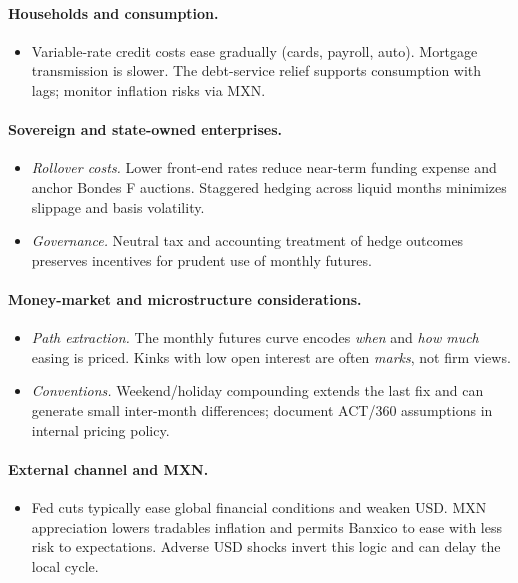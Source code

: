 \documentclass[11pt,a4paper]{article} %
\begin{document}
\paragraph{Households and consumption.}
\begin{itemize}
  \item Variable-rate credit costs ease gradually (cards, payroll, auto). Mortgage transmission is slower. The debt-service relief supports consumption with lags; monitor inflation risks via MXN.
\end{itemize}

\paragraph{Sovereign and state-owned enterprises.}
\begin{itemize}
  \item \textit{Rollover costs.} Lower front-end rates reduce near-term funding expense and anchor Bondes F auctions. Staggered hedging across liquid months minimizes slippage and basis volatility.
  \item \textit{Governance.} Neutral tax and accounting treatment of hedge outcomes preserves incentives for prudent use of monthly futures.
\end{itemize}

\paragraph{Money-market and microstructure considerations.}
\begin{itemize}
  \item \textit{Path extraction.} The monthly futures curve encodes \emph{when} and \emph{how much} easing is priced. Kinks with low open interest are often \emph{marks}, not firm views.
  \item \textit{Conventions.} Weekend/holiday compounding extends the last fix and can generate small inter-month differences; document ACT/360 assumptions in internal pricing policy.
\end{itemize}

\paragraph{External channel and MXN.}
\begin{itemize}
  \item Fed cuts typically ease global financial conditions and weaken USD. MXN appreciation lowers tradables inflation and permits Banxico to ease with less risk to expectations. Adverse USD shocks invert this logic and can delay the local cycle.
\end{itemize}
\end{document}
